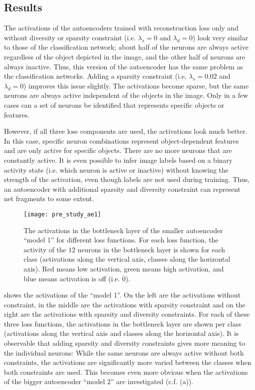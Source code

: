 \subsection{Results}
The activations of the autoencoders trained with reconstruction loss only and without diversity or sparsity constraint (i.e. $\lambda_s = 0$ and $\lambda_d = 0$) look very similar to those of the classification network; about half of the neurons are always active regardless of the object depicted in the image, and the other half of neurons are always inactive. Thus, this version of the autoencoder has the same problem as the classification networks. Adding a sparsity constraint (i.e. $\lambda_s = 0.02$ and $\lambda_d = 0$) improves this issue slightly. The activations become sparse, but the same neurons are always active independent of the objects in the image. Only in a few cases can a set of neurons be identified that represents specific objects or features.

However, if all three loss components are used, the activations look much better. In this case, specific neuron combinations represent object-dependent features and are only active for specific objects. There are no more neurons that are constantly active. It is even possible to infer image labels based on a binary activity state (i.e. which neuron is active or inactive) without knowing the strength of the activation, even though labels are not used during training. Thus, an autoencoder with additional sparsity and diversity constraint can represent net fragments to some extent.


\begin{figure}[h]
    \centering
    \texttt{[image: pre\_study\_ae1]}
    \caption[Network activations of the smaller autoencoder model]{The activations in the bottleneck layer of the smaller autoencoder ``model 1'' for different loss functions. For each loss function, the activity of the $12$ neurons in the bottleneck layer is shown for each class (activations along the vertical axis, classes along the horizontal axis). Red means low activation, green means high activation, and blue means activation is off (i.e. $0$).}
\end{figure}

 shows the activations of the ``model 1''.
On the left are the activations without constraint, in the middle are the activations with sparsity constraint and on the right are the activations with sparsity and diversity constraints.
For each of these three loss functions, the activations in the bottleneck layer are shown per class (activations along the vertical axis and classes along the horizontal axis).
It is observable that adding sparsity and diversity constraints gives more meaning to the individual neurons: While the same neurons are always active  without both constraints, the activations are significantly more varied between the classes when both constraints are used.
This becomes even more obvious when the activations of the bigger autoencoder ``model 2'' are investigated (c.f.  (a)).

